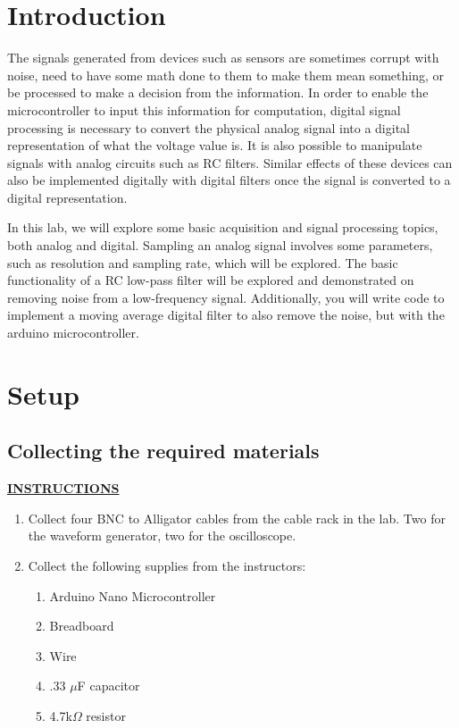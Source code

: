 \documentclass[12pt]{article}
\begin{document}
\MakeLabTop

\section{Introduction}

The signals generated from devices such as sensors are sometimes corrupt with noise, need to have some math done to them to make them mean something, or be processed to make a decision from the information. In order to enable the microcontroller to input this information for computation, digital signal processing is necessary to convert the physical analog signal into a digital representation of what the voltage value is. It is also possible to manipulate signals with analog circuits such as RC filters. Similar effects of these devices can also be implemented digitally with digital filters once the signal is converted to a digital representation.

In this lab, we will explore some basic acquisition and signal processing topics, both analog and digital. Sampling an analog signal involves some parameters, such as resolution and sampling rate, which will be explored. The basic functionality of a RC low-pass filter will be explored and demonstrated on removing noise from a low-frequency signal. Additionally, you will write code to implement a moving average digital filter to also remove the noise, but with the arduino microcontroller. 

\section{Setup}

\subsection{Collecting the required materials}

\textbf{\underline{INSTRUCTIONS}}

\begin{enumerate}
    \item Collect four BNC to Alligator cables from the cable rack in the lab. Two for the waveform generator, two for the oscilloscope.
    \item Collect the following supplies from the instructors:
    \begin{enumerate}
        \item Arduino Nano Microcontroller
        \item Breadboard
        \item Wire
        \item .33 $\mu$F capacitor
        \item 4.7k$\Omega$ resistor
    \end{enumerate}
\end{enumerate}
\end{document}
